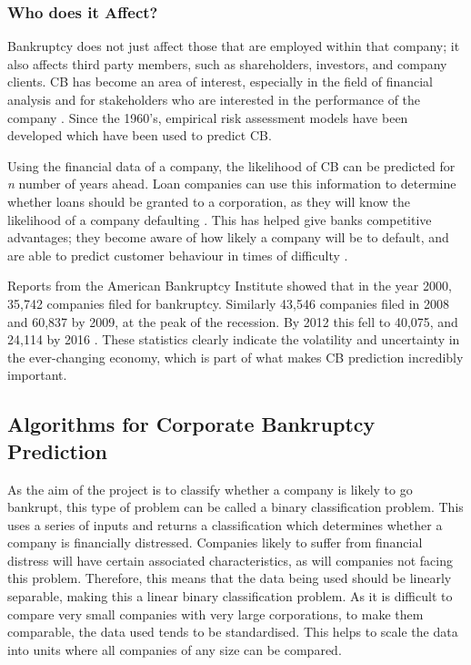 \documentclass[11pt]{article}
\begin{document}
\subsubsection{Who does it Affect?}\label{subsubsec:affect}
Bankruptcy does not just affect those that are employed within that company; it also affects third party members, such as shareholders, investors, and company clients. CB has become an area of interest, especially in the field of financial analysis and for stakeholders who are interested in the performance of the company \cite{ref-four}. Since the 1960's, empirical risk assessment models have been developed which have been used to predict CB. 

Using the financial data of a company, the likelihood of CB can be predicted for \textit{n} number of years ahead. 
Loan companies can use this information to determine whether loans should be granted to a corporation, as they will know the likelihood of a company defaulting \cite{ref-four}. This has helped give banks competitive advantages; they become aware of how likely a company will be to default, and are able to predict customer behaviour in times of difficulty \cite{ref-four}.

Reports from the American Bankruptcy Institute \cite{ref-five} showed that in the year 2000, 35,742 companies filed for bankruptcy. Similarly 43,546 companies filed in 2008 and 60,837 by 2009, at the peak of the recession. By 2012 this fell to 40,075, and 24,114 by 2016 . These statistics clearly indicate the volatility and uncertainty in the ever-changing economy, which is part of what makes CB prediction incredibly important.
\subsection{Algorithms for Corporate Bankruptcy Prediction}\label{subsec:algos}
As the aim of the project is to classify whether a company is likely to go bankrupt, this type of problem can be called a binary classification problem. This uses a series of inputs and returns a classification which determines whether a company is financially distressed. Companies likely to suffer from financial distress will have certain associated characteristics, as will companies not facing this problem. Therefore, this means that the data being used should be linearly separable, making this a linear binary classification problem. As it is difficult to compare very small companies with very large corporations, to make them comparable, the data used tends to be standardised. This helps to scale the data into units where all companies of any size can be compared. 
\end{document}
